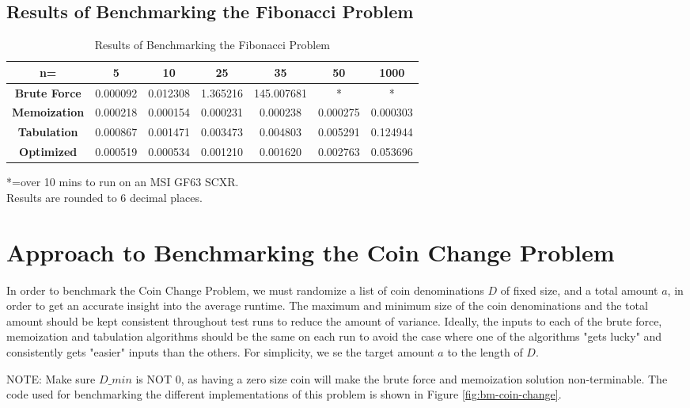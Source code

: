 \subsection{Results of Benchmarking the Fibonacci Problem}
\begin{table}[H]
    \centering
    \begin{tabular}{|c|c|c|c|c|c|c|}
        \hline
        \textbf{n=}  & \textbf{5} & \textbf{10} & \textbf{25} & \textbf{35} & \textbf{50}  & \textbf{1000} \\
        \hline
        \textbf{Brute Force} & 0.000092 & 0.012308 & 1.365216 & 145.007681 & * & * \\
        \hline
        \textbf{Memoization} & 0.000218 & 0.000154 & 0.000231 & 0.000238 & 0.000275 & 0.000303 \\
        \hline
        \textbf{Tabulation} & 0.000867 & 0.001471 & 0.003473 & 0.004803 & 0.005291 & 0.124944 \\
        \hline
        \textbf{Optimized} & 0.000519 & 0.000534 & 0.001210 & 0.001620 & 0.002763 & 0.053696 \\
        \hline
    \end{tabular}
    \caption{Results of Benchmarking the Fibonacci Problem}
\end{table}

*=over 10 mins to run on an MSI GF63 SCXR.\\
Results are rounded to 6 decimal places.


\section{Approach to Benchmarking the Coin Change Problem}

In order to benchmark the Coin Change Problem, we must randomize a list of coin denominations $D$ of fixed size, and a total amount $a$, in order to get an accurate insight into the average runtime.
The maximum and minimum size of the coin denominations and the total amount should be kept consistent throughout test runs to reduce the amount of variance.
Ideally, the inputs to each of the brute force, memoization and tabulation algorithms should be the same on each run to avoid the case where one of the algorithms "gets lucky" and consistently gets "easier" inputs than the others.
For simplicity, we se the target amount $a$ to the length of $D$.

NOTE: Make sure $D\_min$ is NOT 0, as having a zero size coin will make the brute force and memoization solution non-terminable.
The code used for benchmarking the different implementations of this problem is shown in Figure \ref{fig:bm-coin-change}.

